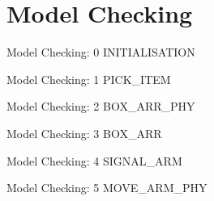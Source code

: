 \documentclass{beamer}
\begin{document}
\section{Model Checking}

\begin{frame}[containsverbatim]{Model Checking: 0 INITIALISATION}
\begin{figure}[htbp]
  \centering
  
\end{figure}
\end{frame}


\begin{frame}[containsverbatim]{Model Checking: 1 PICK\_ITEM}
\begin{figure}[htbp]
  \centering
  
\end{figure}
\end{frame}


\begin{frame}[containsverbatim]{Model Checking: 2 BOX\_ARR\_PHY}
\begin{figure}[htbp]
  \centering
  
\end{figure}
\end{frame}


\begin{frame}[containsverbatim]{Model Checking: 3 BOX\_ARR}
\begin{figure}[htbp]
  \centering
  
\end{figure}
\end{frame}


\begin{frame}[containsverbatim]{Model Checking: 4 SIGNAL\_ARM}
\begin{figure}[htbp]
  \centering
  
\end{figure}
\end{frame}


\begin{frame}[containsverbatim]{Model Checking: 5 MOVE\_ARM\_PHY}
\begin{figure}[htbp]
  \centering
  
\end{figure}
\end{frame}
\end{document}

